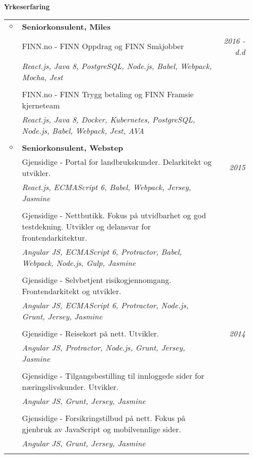 \documentclass[overlapped,line,letterpaper]{res}
\begin{document}
\begin{resume}
\section{}
\textbf{Yrkeserfaring}\\
\makebox[\textwidth]{\hrulefill}

\begin{tabularx}{\textwidth}{lXr}

$\diamond$	& \textbf{Seniorkonsulent, Miles} 	& \\
& FINN.no - FINN Oppdrag og FINN Småjobber & \textit{2016 - d.d} \\
& \small \textit{React.js, Java 8, PostgreSQL, Node.js, Babel, Webpack, Mocha, Jest} & \\
&& \\
& FINN.no - FINN Trygg betaling og FINN Framsie kjerneteam & \\
& \small \textit{React.js, Java 8, Docker, Kubernetes, PostgreSQL, Node.js, Babel, Webpack, Jest, AVA} & \\
&& \\
$\diamond$	& \textbf{Seniorkonsulent, Webstep} 	& \\
& Gjensidige - Portal for landbrukskunder. Delarkitekt og utvikler. & \textit{2015} \\
& \small \textit{React.js, ECMAScript 6, Babel, Webpack, Jersey, Jasmine} & \\
&& \\
& Gjensidige - Nettbutikk. Fokus på utvidbarhet og god testdekning. Utvikler og
delansvar for frontendarkitektur. & \\
& \small \textit{Angular JS, ECMAScript 6, Protractor, Babel, Webpack, Node.js, Gulp, Jasmine} & \\
&& \\
& Gjensidige - Selvbetjent risikogjennomgang. Frontendarkitekt og utvikler. & \\
& \small \textit{Angular JS, ECMAScript 6, Protractor, Node.js, Grunt, Jersey, Jasmine} & \\
&& \\
& Gjensidige - Reisekort på nett. Utvikler. & \textit{2014} \\
& \small \textit{Angular JS, Protractor, Node.js, Grunt, Jersey, Jasmine} & \\
&& \\
& Gjensidige - Tilgangsbestilling til innloggede sider for næringslivskunder. Utvikler. & \\
& \small \textit{Angular JS, Grunt, Jersey, Jasmine} & \\
&& \\
& Gjensidige - Forsikringstilbud på nett. Fokus på gjenbruk av
JavaScript og mobilvennlige sider. & \\
& \small \textit{Angular JS, Grunt, Jersey, Jasmine} & \\
&& \\
\end{tabularx}


\end{resume}
\end{document}
